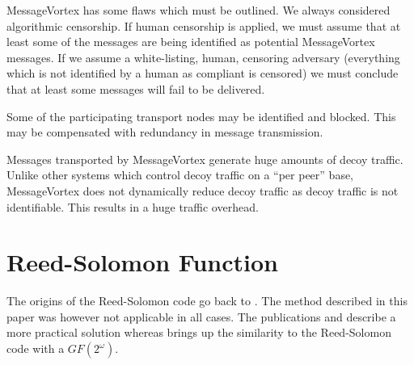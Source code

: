 \documentclass[runningheads]{llncs}
\begin{document}
MessageVortex has some flaws which must be outlined. We always considered algorithmic censorship. If human censorship is applied, we must assume that at least some of the messages are being identified as potential MessageVortex messages. If we assume a white-listing, human, censoring adversary (everything which is not identified by a human as compliant is censored) we must conclude that at least some messages will fail to be delivered. 

Some of the participating transport nodes may be identified and blocked. This may be compensated with redundancy in message transmission. 

Messages transported by MessageVortex generate huge amounts of decoy traffic. Unlike other systems which control decoy traffic on a ``per peer'' base, MessageVortex does not dynamically reduce decoy traffic as decoy traffic is not identifiable. This results in a huge traffic overhead.



%

\newpage
\appendix

\section{Reed-Solomon Function\label{sec:reedSolomon}}
The origins of the Reed-Solomon code go back to \cite{reed1960polynomial}. The method described in this paper was however not applicable in all cases. The publications \cite{karnin1983secret} and \cite{Rabin:1989:EDI:62044.62050} describe a more practical solution whereas \cite{preparata1989holographic} brings up the similarity to the Reed-Solomon code with a $GF(2^\omega)$. 
\end{document}
